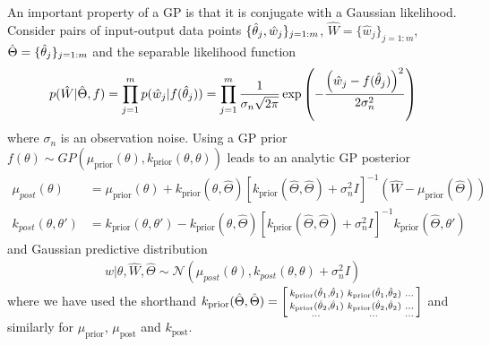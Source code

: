 An important property of a GP is that it is conjugate with a Gaussian likelihood.  Consider pairs of input-output data points $\{\hat{\theta}_j,\hat{w}_j\}_{j=1:m}$, $\hat{W} = \{\hat{w}_j\}_{j=1:m}$, $\hat{\Theta} = \{\hat{\theta}_j\}_{j=1:m}$ and the separable likelihood function
\begin{align}
\label{eq:GP-lik}
p(\hat{W}| \hat{\Theta}, f) = \prod_{j=1}^{m}p(\hat{w}_j | f(\hat{\theta}_j)) = \prod_{j=1}^{m}\frac{1}{\sigma_{n}\sqrt{2\pi}} \exp \left(-\frac{\left(\hat{w}_j-f(\hat{\theta}_j)\right)^2}{2\sigma_n^2}\right)
\end{align}
where $\sigma_n$ is an observation noise. Using a GP prior $f\left(\theta\right)\sim GP(\mu_{\text{prior}}\left(\theta\right),k_{\text{prior}}\left(\theta,\theta\right))$ leads to an analytic GP posterior 
\begin{align}
\label{eq:gpPosterior}
\mu_{post} \left(\theta\right) & = \mu_{\text{prior}}\left(\theta\right) + k_{\text{prior}}\left(\theta,\hat{\Theta} \right) \left[k_{\text{prior}}\left(\hat{\Theta} ,\hat{\Theta}  \right) + \sigma_n^2 I\right]^{-1} \left(\hat{W} -\mu_{\text{prior}}\left(\hat{\Theta} \right)\right) \\
k_{post} \left(\theta,\theta'\right) & = k_{\text{prior}} \left(\theta,\theta'\right) - k_{\text{prior}}\left(\theta,\hat{\Theta} \right) \left[k_{\text{prior}}\left(\hat{\Theta},\hat{\Theta} \right) + \sigma_n^2 I\right]^{-1} k_{\text{prior}}\left(\hat{\Theta} ,\theta'\right)
\end{align}
and Gaussian predictive distribution
\begin{align}
\label{eq:gpPred}
w | \theta, \hat{W}, \hat{\Theta} \sim \mathcal{N} \left(\mu_{post}\left(\theta\right), k_{post} \left(\theta,\theta\right) + \sigma_n^2 I\right)
\end{align}
where we have used the shorthand $k_{\text{prior}}(\hat{\Theta},\hat{\Theta}) = \left[\begin{smallmatrix} k_{\text{prior}}(\hat{\theta}_1,\hat{\theta}_1) & k_{\text{prior}}(\hat{\theta}_1,\hat{\theta}_2) & \dots\\ k_{\text{prior}}(\hat{\theta}_2,\hat{\theta}_1) & k_{\text{prior}}(\hat{\theta}_2,\hat{\theta}_2) & \dots \\ \dots & \dots & \dots\end{smallmatrix}\right]$ and similarly for $\mu_{\text{prior}}$, $\mu_{\text{post}}$ and $k_{\text{post}}$.